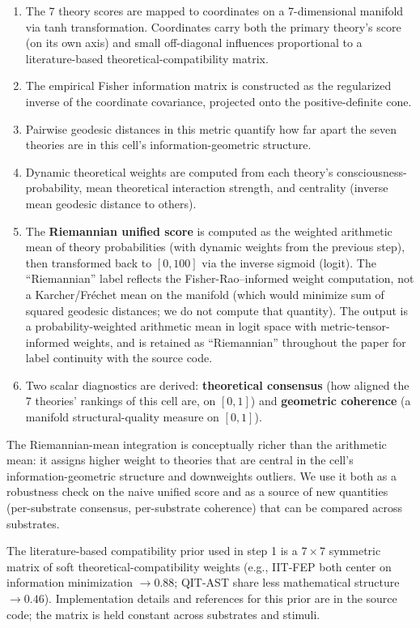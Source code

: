 \documentclass[11pt,a4paper]{article}
\begin{document}
\begin{enumerate}
  \item The 7 theory scores are mapped to coordinates on a 7-dimensional manifold via tanh transformation. Coordinates carry both the primary theory's score (on its own axis) and small off-diagonal influences proportional to a literature-based theoretical-compatibility matrix.
  \item The empirical Fisher information matrix is constructed as the regularized inverse of the coordinate covariance, projected onto the positive-definite cone.
  \item Pairwise geodesic distances in this metric quantify how far apart the seven theories are in this cell's information-geometric structure.
  \item Dynamic theoretical weights are computed from each theory's consciousness-probability, mean theoretical interaction strength, and centrality (inverse mean geodesic distance to others).
  \item The \textbf{Riemannian unified score} is computed as the weighted arithmetic mean of theory probabilities (with dynamic weights from the previous step), then transformed back to $[0, 100]$ via the inverse sigmoid (logit). The ``Riemannian'' label reflects the Fisher-Rao--informed weight computation, not a Karcher/Fr{\'e}chet mean on the manifold (which would minimize sum of squared geodesic distances; we do not compute that quantity). The output is a probability-weighted arithmetic mean in logit space with metric-tensor-informed weights, and is retained as ``Riemannian'' throughout the paper for label continuity with the source code.
  \item Two scalar diagnostics are derived: \textbf{theoretical consensus} (how aligned the 7 theories' rankings of this cell are, on $[0, 1]$) and \textbf{geometric coherence} (a manifold structural-quality measure on $[0, 1]$).
\end{enumerate}

The Riemannian-mean integration is conceptually richer than the arithmetic mean: it assigns higher weight to theories that are central in the cell's information-geometric structure and downweights outliers. We use it both as a robustness check on the naive unified score and as a source of new quantities (per-substrate consensus, per-substrate coherence) that can be compared across substrates.

The literature-based compatibility prior used in step 1 is a $7 \times 7$ symmetric matrix of soft theoretical-compatibility weights (e.g., IIT-FEP both center on information minimization $\rightarrow 0.88$; QIT-AST share less mathematical structure $\rightarrow 0.46$). Implementation details and references for this prior are in the source code; the matrix is held constant across substrates and stimuli.
\end{document}
